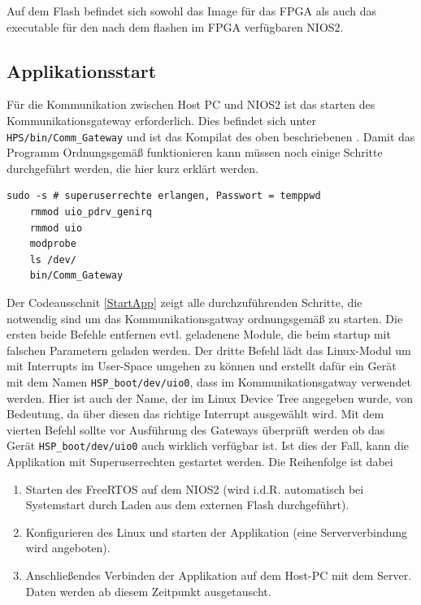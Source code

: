 Auf dem Flash befindet sich sowohl das Image für das \ac{FPGA} als auch das executable für den nach dem flashen im \ac{FPGA} verfügbaren NIOS2. 
\subsection{Applikationsstart}
Für die Kommunikation zwischen Host PC und NIOS2 ist das starten des Kommunikationsgateway erforderlich. Dies befindet sich unter \texttt{HPS/bin/Comm\_Gateway} und ist das Kompilat des oben beschriebenen . Damit das Programm Ordnungsgemäß funktionieren kann müssen noch einige Schritte durchgeführt werden, die hier kurz erklärt werden.

\lstset{language=bash}
\begin{lstlisting}[caption=Listing, label={StartApp}]
	sudo -s # superuserrechte erlangen, Passwort = temppwd
	rmmod uio_pdrv_genirq
	rmmod uio
	modprobe
	ls /dev/
	bin/Comm_Gateway
\end{lstlisting}

Der Codeausschnit \ref{StartApp} zeigt alle durchzuführenden Schritte, die notwendig sind um das Kommunikationsgatway ordnungsgemäß zu starten. Die ersten beide Befehle entfernen evtl. geladenene Module, die beim startup mit falschen Parametern geladen werden. Der dritte Befehl lädt das Linux-Modul um mit Interrupts im User-Space umgehen zu können und erstellt dafür ein Gerät mit dem Namen \texttt{HSP\_boot/dev/uio0}, dass im Kommunikationsgatway verwendet werden. Hier ist auch der Name, der im Linux Device Tree angegeben wurde, von Bedeutung, da über diesen das richtige Interrupt ausgewählt wird. Mit dem vierten Befehl sollte vor Ausführung des Gateways überprüft werden ob das Gerät \texttt{HSP\_boot/dev/uio0} auch wirklich verfügbar ist. Ist dies der Fall, kann die Applikation mit Superuserrechten gestartet werden. Die Reihenfolge ist dabei
\begin{enumerate}
	\item Starten des FreeRTOS auf dem NIOS2 (wird i.d.R. automatisch bei Systemstart durch Laden aus dem externen Flash durchgeführt).
	\item Konfigurieren des Linux und starten der Applikation (eine Serververbindung wird angeboten).
	\item Anschließendes Verbinden der Applikation auf dem Host-PC mit dem Server. Daten werden ab diesem Zeitpunkt ausgetauscht.
\end{enumerate}


